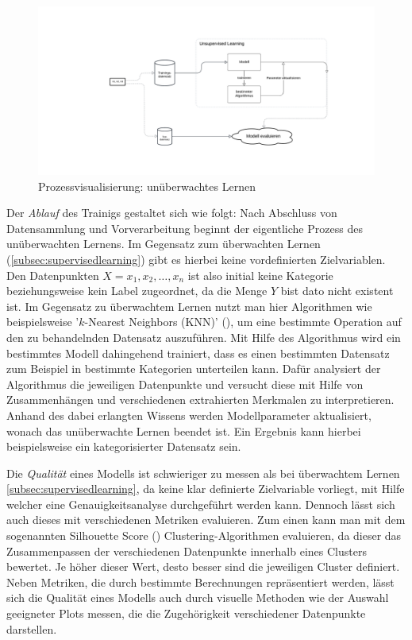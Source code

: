 \begin{figure}[H]\label{img:unsupervisedworkflow}
	\hspace{-15mm}
	\centering
	\includegraphics[width=0.8\linewidth]{Bilder/UnsupervisedLearning.png}
	\caption{Prozessvisualisierung: unüberwachtes Lernen}
\end{figure}
Der \textit{Ablauf} des Trainigs gestaltet sich wie folgt: Nach Abschluss von Datensammlung und Vorverarbeitung beginnt der eigentliche Prozess des unüberwachten Lernens. Im Gegensatz zum überwachten Lernen (\ref{subsec:supervisedlearning}) gibt es hierbei keine vordefinierten Zielvariablen. Den Datenpunkten $X = x_1, x_2, \ldots, x_n$ ist also initial keine Kategorie beziehungsweise kein Label zugeordnet, da die Menge $Y$ bist dato nicht existent ist. Im Gegensatz zu überwachtem Lernen nutzt man hier Algorithmen wie beispielsweise '$k$-Nearest Neighbors (KNN)' (\cite[38]{joshi_machine_2020}), um eine bestimmte Operation auf den zu behandelnden Datensatz auszuführen. Mit Hilfe des Algorithmus wird ein bestimmtes Modell dahingehend trainiert, dass es einen bestimmten Datensatz zum Beispiel in bestimmte Kategorien unterteilen kann. Dafür analysiert der Algorithmus die jeweiligen Datenpunkte und versucht diese mit Hilfe von Zusammenhängen und verschiedenen extrahierten Merkmalen zu interpretieren. Anhand des dabei erlangten Wissens werden Modellparameter aktualisiert, wonach das unüberwachte Lernen beendet ist. Ein Ergebnis kann hierbei beispielsweise ein kategorisierter Datensatz sein.

Die  \textit{Qualität} eines Modells ist schwieriger zu messen als bei überwachtem Lernen \ref{subsec:supervisedlearning}, da keine klar definierte Zielvariable vorliegt, mit Hilfe welcher eine Genauigkeitsanalyse durchgeführt werden kann. Dennoch lässt sich auch dieses mit verschiedenen Metriken evaluieren. Zum einen kann man mit dem sogenannten Silhouette Score (\cite{shahapure_cluster_2020}) Clustering-Algorithmen evaluieren, da dieser das Zusammenpassen der verschiedenen Datenpunkte innerhalb eines Clusters bewertet. Je höher dieser Wert, desto besser sind die jeweiligen Cluster definiert. Neben Metriken, die durch bestimmte Berechnungen repräsentiert werden, lässt sich die Qualität eines Modells auch durch visuelle Methoden wie der Auswahl geeigneter Plots messen, die die Zugehörigkeit verschiedener Datenpunkte darstellen.
